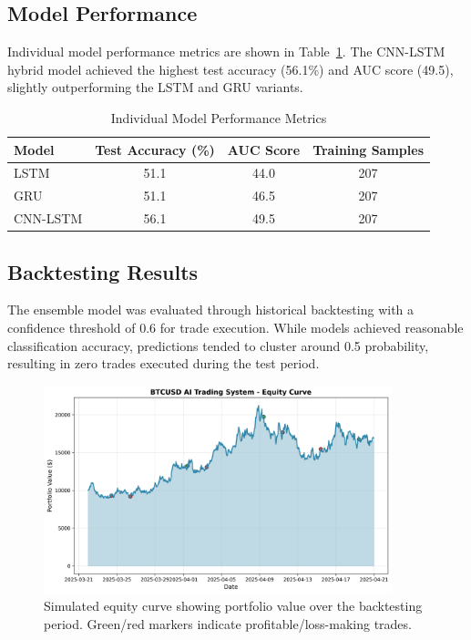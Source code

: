 \documentclass[11pt,a4paper]{article}
\begin{document}
\subsection{Model Performance}
Individual model performance metrics are shown in Table~\ref{tab:model_performance}. The CNN-LSTM hybrid model achieved the highest test accuracy (56.1\%) and AUC score (49.5), slightly outperforming the LSTM and GRU variants.

\begin{table}[ht]
\centering
\caption{Individual Model Performance Metrics}
\label{tab:model_performance}
\begin{tabular}{@{}lccc@{}}
\toprule
Model & Test Accuracy (\%) & AUC Score & Training Samples \\
\midrule
LSTM & 51.1 & 44.0 & 207 \\
GRU & 51.1 & 46.5 & 207 \\
CNN-LSTM & 56.1 & 49.5 & 207 \\
\bottomrule
\end{tabular}
\end{table}

\subsection{Backtesting Results}
The ensemble model was evaluated through historical backtesting with a confidence threshold of 0.6 for trade execution. While models achieved reasonable classification accuracy, predictions tended to cluster around 0.5 probability, resulting in zero trades executed during the test period.



\begin{figure}[ht]
    \centering
    \includegraphics[width=0.9\textwidth]{figures/equity_curve.png}
    \caption{Simulated equity curve showing portfolio value over the backtesting period. Green/red markers indicate profitable/loss-making trades.}
    \label{fig:equity}
\end{figure}
\end{document}

